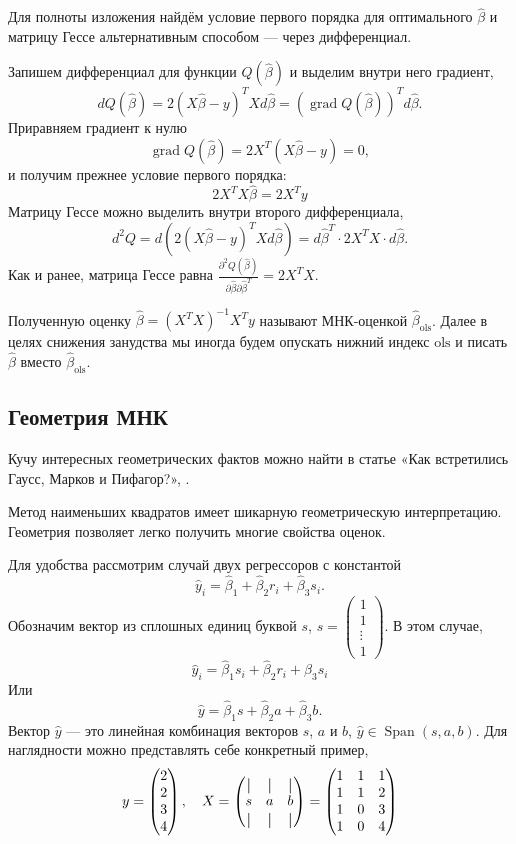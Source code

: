 \documentclass[12pt]{article}
\DeclareMathOperator{\grad}{grad}
\DeclareMathOperator{\Span}{Span}
\newcommand*{\vertbar}{\rule[-1ex]{0.5pt}{2.5ex}}
\newcommand{\hb}{\hat{\beta}}
\newcommand{\hy}{\hat{y}}
\newcommand{\ols}{\text{ols}}
\begin{document}
Для полноты изложения найдём условие первого порядка для оптимального $\hb$ и матрицу Гессе альтернативным способом — через дифференциал.

Запишем дифференциал для функции $Q(\hb)$ и выделим внутри него градиент,
\[
dQ(\hb) = 2(X\hb - y)^TX d\hb = (\grad Q(\hb))^T d\hb.
\]
Приравняем градиент к нулю
\[
\grad Q(\hb) =  2X^T(X\hb - y) = 0,
\]
и получим прежнее условие первого порядка:
\[
2X^TX\hb = 2X^{T}y
\]
Матрицу Гессе можно выделить внутри второго дифференциала,
\[
d^2 Q = d(2(X\hb - y)^TX d\hb) = d\hb^T \cdot 2X^T X \cdot d\hb. 
\]
Как и ранее, матрица Гессе равна $\frac{\partial^2 Q(\hb)}{\partial \hb \partial \hb^T} = 2X^TX$.

Полученную оценку $\hb = (X^TX)^{-1}X^Ty$ называют МНК-оценкой $\hb_{\ols}$. 
Далее в целях снижения занудства мы иногда будем опускать нижний индекс $\ols$ и писать $\hb$ вместо $\hb_{\ols}$.


\subsection{Геометрия МНК}

Кучу интересных геометрических фактов можно найти в статье «Как встретились Гаусс, Марков и Пифагор?», \cite{gnilova2018gauss}.

Метод наименьших квадратов имеет шикарную геометрическую интерпретацию.
Геометрия позволяет легко получить многие свойства оценок. 

Для удобства рассмотрим случай двух регрессоров с константой
\[
\hy_i = \hb_1 + \hb_2 r_i + \hb_3 s_i.
\]
Обозначим вектор из сплошных единиц буквой $s$, $s = \begin{pmatrix}
    1 \\
    1 \\
    \vdots \\
    1
\end{pmatrix}$.
В этом случае, 
\[
\hy_i = \hb_1 s_i + \hb_2 r_i + \hb_3 s_i
\]
Или
\[
\hy = \hb_1 s + \hb_2 a + \hb_3 b.
\]
Вектор $\hy$ — это линейная комбинация векторов $s$, $a$ и $b$,
$\hy \in \Span(s, a, b)$.
Для наглядности можно представлять себе конкретный пример, 
\[
y = \begin{pmatrix}
    2 \\
    2 \\
    3 \\
    4 \\
\end{pmatrix}, \quad 
X = \begin{pmatrix}
    \vertbar & \vertbar & \vertbar \\
    s & a & b \\
    \vertbar & \vertbar & \vertbar \\    
\end{pmatrix} = \begin{pmatrix}
    1 & 1 & 1 \\
    1 & 1 & 2 \\
    1 & 0 & 3 \\
    1 & 0 & 4 \\
\end{pmatrix}
\]
\end{document}
